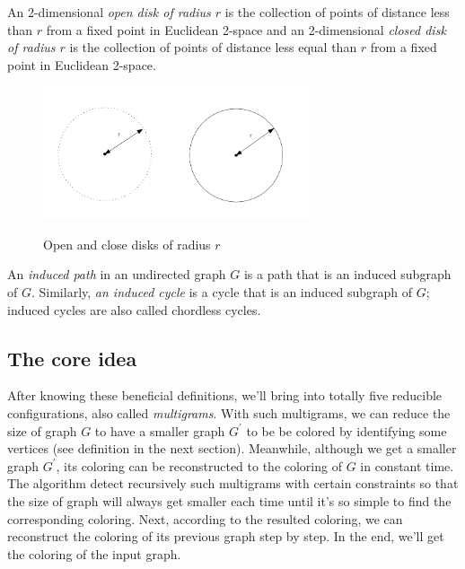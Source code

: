 \begin{definition}
An 2-dimensional \textit{open disk of radius $r$} is the collection of points of distance less than $r$ from a fixed point in Euclidean 2-space and an 2-dimensional \textit{closed disk of radius $r$} is the collection of points of distance less equal than $r$ from a fixed point in Euclidean 2-space. \cite{Open_disk}

\begin{figure}[H] %
\centering %
\includegraphics[width=0.7\textwidth]{figure/closeddisk.png} 
\label{figure} %
\caption{Open and close disks of radius $r$}
\end{figure}
\end{definition}

\begin{definition}
An \textit{induced path} in an undirected graph $G$ is a path that is an induced subgraph of $G$. Similarly, \textit{an induced cycle} is a cycle that is an induced subgraph of $G$; induced cycles are also called chordless cycles. \cite{Induced_path}
\end{definition}

\subsection{The core idea}
After knowing these beneficial definitions, we'll bring into totally five reducible configurations, also called \textit{multigrams}. With such multigrams, we can reduce the size of graph $G$ to have a smaller graph $G^{'}$ to be be colored by identifying some vertices (see definition in the next section). Meanwhile, although we get a smaller graph $G^{'}$, its coloring can be reconstructed to the coloring of $G$ in constant time. The algorithm detect recursively such multigrams with certain constraints so that the size of graph will always get smaller each time until it's so simple to find the corresponding coloring. Next, according to the resulted coloring, we can reconstruct the coloring of its previous graph step by step. In the end, we'll get the coloring of the input graph. 

